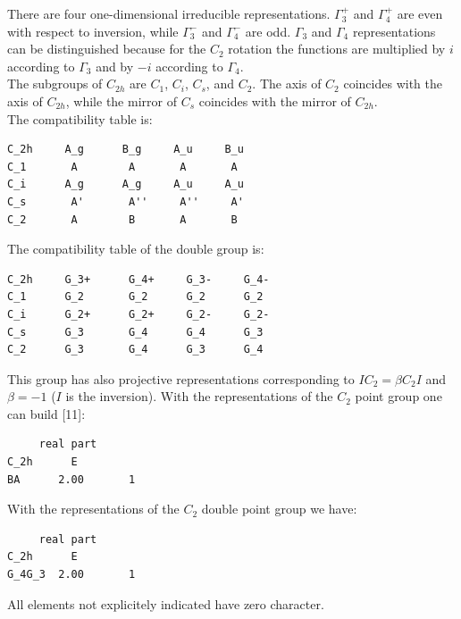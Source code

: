 \documentclass[12pt,a4paper]{article}
\begin{document}
There are four one-dimensional irreducible representations. $\Gamma_3^+$
and $\Gamma_4^+$ are even with respect to inversion, while
$\Gamma_3^-$ and $\Gamma_4^-$ are odd. $\Gamma_3$ and $\Gamma_4$ 
representations can be distinguished because for the $C_2$ rotation
the functions are multiplied by $i$ according to $\Gamma_3$ and 
by $-i$ according to $\Gamma_4$. \\
The subgroups of $C_{2h}$ are $C_1$, $C_i$, $C_s$, and $C_2$. The
axis of $C_2$ coincides with the axis of $C_{2h}$, while the 
mirror of $C_s$ coincides with the mirror of $C_{2h}$.\\
The compatibility table is:
\begin{verbatim}
C_2h     A_g      B_g     A_u     B_u
C_1       A        A       A       A
C_i      A_g      A_g     A_u     A_u
C_s       A'       A''     A''     A'
C_2       A        B       A       B
\end{verbatim}
The compatibility table of the double group is:
\begin{verbatim}
C_2h     G_3+      G_4+     G_3-     G_4- 
C_1      G_2       G_2      G_2      G_2
C_i      G_2+      G_2+     G_2-     G_2-
C_s      G_3       G_4      G_4      G_3
C_2      G_3       G_4      G_3      G_4
\end{verbatim}
This group has also projective representations corresponding to
$IC_2 = \beta C_2 I$ and $\beta=-1$ ($I$ is the inversion).
With the representations of the $C_2$ point group one can build [11]:
\begin{verbatim}
     real part
C_2h      E     
BA      2.00       1
\end{verbatim}
With the representations of the $C_2$ double point group we have:
\begin{verbatim}
     real part
C_2h      E     
G_4G_3  2.00       1
\end{verbatim}
All elements not explicitely indicated have zero character.

\newpage
\end{document}
